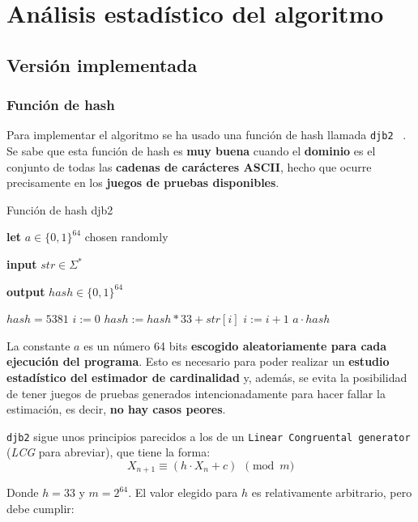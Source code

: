 % 
\section{Análisis estadístico del algoritmo}

\subsection{Versión implementada}

\subsubsection{Función de hash}
Para implementar el algoritmo se ha usado una función de hash llamada \texttt{djb2} ~\cite{hash:djb2}.
Se sabe que esta función de hash
es \textbf{muy buena} cuando el \textbf{dominio} es el conjunto de todas las \textbf{cadenas de carácteres ASCII},
hecho que ocurre precisamente en los \textbf{juegos de pruebas disponibles}.

\begin{algorithm}[h]
\caption{Función de hash djb2}
\textbf{let} $a \in \{0, 1\}^{64}$ chosen randomly

\textbf{input} $str \in \Sigma^*$

\textbf{output} $hash \in \{0, 1\}^{64}$
\begin{algorithmic}
    \STATE $hash = 5381$
    \STATE $i := 0$
        \STATE $hash := hash * 33 + str[i]$
        \STATE $i := i + 1$
    \ENDWHILE
    \RETURN $a \cdot hash$
\end{algorithmic}
\end{algorithm}

La constante $a$ es un número 64 bits \textbf{escogido aleatoriamente para cada ejecución del programa}.
Esto es necesario para poder realizar un \textbf{estudio estadístico del estimador de cardinalidad} y, además, se evita la posibilidad
de tener juegos de pruebas generados intencionadamente para hacer fallar la estimación, es decir, \textbf{no hay casos peores}.

\texttt{djb2} sigue unos principios parecidos a los de un \texttt{Linear Congruental generator}  (\emph{LCG} para abreviar),
que tiene la forma:
$$X_{n+1} \equiv \left( h \cdot X_n + c \right)~~\pmod{m}$$

Donde $h=33$ y $m=2^{64}$. El valor elegido para $h$ es relativamente arbitrario, pero debe cumplir:


